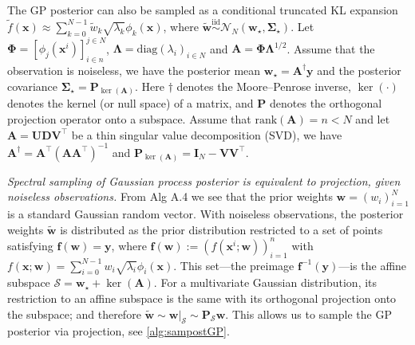 \documentclass{article}
\begin{document}

The GP posterior can also be sampled as a conditional truncated KL expansion
$\widetilde{f}(\mathbf{x}) \approx \sum_{k=0}^{N-1} \widetilde{w}_k \sqrt{\lambda_k} \phi_k(\mathbf{x})$,
where
$\widetilde{\mathbf{w}} \overset{\text{iid}}{\sim} \mathcal{N}_N(\mathbf{w}_\star, \boldsymbol{\Sigma}_\star)$.
Let $\boldsymbol{\Phi} = [\phi_j(\mathbf{x}^i)]_{i \in n}^{j \in N}$,
$\boldsymbol{\Lambda} = \mathrm{diag}(\lambda_i)_{i \in N}$ and
$\mathbf{A} = \boldsymbol{\Phi} \boldsymbol{\Lambda}^{1/2}$. Assume
that the observation is noiseless, we have
the posterior mean $\mathbf{w}_\star = \mathbf{A}^\dagger \mathbf{y}$
and the posterior covariance
$\boldsymbol{\Sigma}_\star = \mathbf{P}_{\ker(\mathbf{A})}$. Here
$\dagger$ denotes the Moore--Penrose inverse, $\ker(\cdot)$ denotes the
kernel (or null space) of a matrix, and $\mathbf{P}$ denotes the
orthogonal projection operator onto a subspace. Assume that
$\mathrm{rank}(\mathbf{A}) = n < N$ and let
$\mathbf{A} = \mathbf{U} \mathbf{D} \mathbf{V}^\intercal$ be a thin singular value decomposition (SVD), we have
$\mathbf{A}^\dagger = \mathbf{A}^\intercal (\mathbf{A} \mathbf{A}^\intercal)^{-1}$
and
$\mathbf{P}_{\ker(\mathbf{A})} = \mathbf{I}_N - \mathbf{V} \mathbf{V}^\intercal$.

\emph{Spectral sampling of Gaussian process posterior is equivalent to
	projection, given noiseless observations.} From Alg A.4 we see that the
prior weights $\mathbf{w} = (w_i)_{i=1}^N$ is a standard Gaussian
random vector. With noiseless observations, the posterior weights
$\widetilde{\mathbf{w}}$ is distributed as the prior distribution
restricted to a set of points satisfying
$\mathbf{f}(\mathbf{w}) = \mathbf{y}$, where
$\mathbf{f}(\mathbf{w}) := (f(\mathbf{x}^i; \mathbf{w}))_{i=1}^n$ with
$f(\mathbf{x}; \mathbf{w}) = \sum_{i=0}^{N-1} w_i \sqrt{\lambda_i} \phi_i(\mathbf{x})$.
This set---the preimage $\mathbf{f}^{-1}(\mathbf{y})$---is the affine
subspace $\mathcal{S} = \mathbf{w}_\star + \ker(\mathbf{A})$. For a
multivariate Gaussian distribution, its restriction to an affine
subspace is the same with its orthogonal projection onto the subspace;
and therefore
$\widetilde{\mathbf{w}} \sim \mathbf{w}|_{\mathcal{S}} \sim \mathbf{P}_{\mathcal{S}} \mathbf{w}$.
This allows us to sample the GP posterior via projection, see \cref{alg:sampostGP}.
\end{document}
